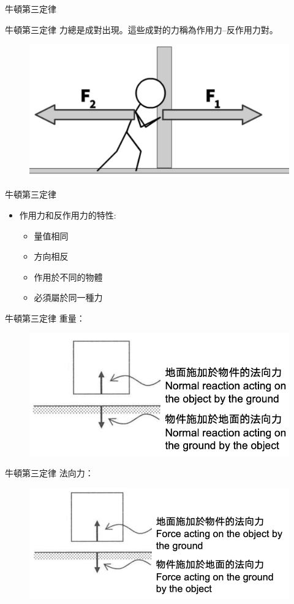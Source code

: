\documentclass[beamer=true]{standalone}
\begin{document}
\begin{frame}{牛頓第三定律 }
    \begin{exampleblock}
        {牛頓第三定律 }
        力總是成對出現。這些成對的力稱為作用力–反作用力對。
    \end{exampleblock}\bigskip
    \begin{figure}[h!]
        \centering
        \includegraphics[width=.5\textwidth]{assets/350b642d.png}
    \end{figure}
\end{frame}
\begin{frame}{牛頓第三定律 }
    \begin{itemize}
        \item 作用力和反作用力的特性:
              \begin{itemize}
                  \item 量值相同
                  \item 方向相反
                  \item 作用於不同的物體
                  \item 必須屬於同一種力
              \end{itemize}
    \end{itemize}
\end{frame}
\begin{frame}{牛頓第三定律 }
    重量：
    \begin{figure}[h!]
        \centering
        \includegraphics[width=.8\textwidth]{assets/4949a09b.png}
    \end{figure}
\end{frame}
\begin{frame}{牛頓第三定律 }
    法向力：
    \begin{figure}[h!]
        \centering
        \includegraphics[width=.8\textwidth]{assets/69c3d3bd.png}
    \end{figure}
\end{frame}
\end{document}
